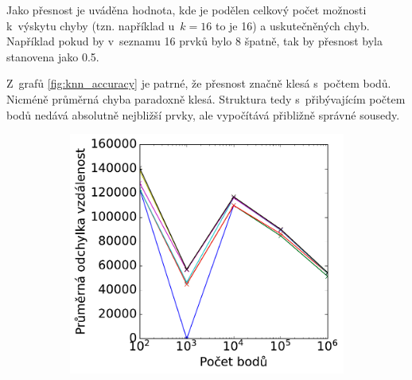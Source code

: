 Jako přesnost je uváděna hodnota, kde je podělen celkový počet možnosti k~výskytu chyby (tzn. například u~$k=16$ to je 16) a uskutečněných chyb. Například pokud by v~seznamu 16 prvků bylo 8 špatně, tak by přesnost byla stanovena jako 0.5.

Z~grafů \ref{fig:knn_accuracy} je patrné, že přesnost značně klesá s~počtem bodů. Nicméně průměrná chyba paradoxně klesá. Struktura tedy s~přibývajícím počtem bodů nedává absolutně nejbližší prvky, ale vypočítává přibližně správné sousedy.

\begin{figure}
 
\begin{subfigure}[t]{.5\columnwidth}
    \centering  
    \includegraphics[scale=0.55]{obrazky-figures/benchmark/knn/benchmark_knn_acc_err.pdf}


\end{subfigure}
\end{figure}
